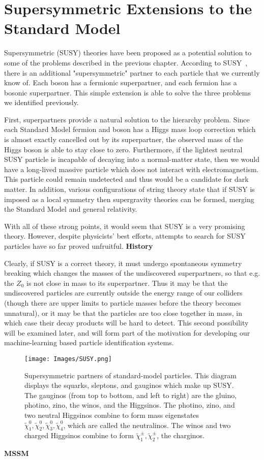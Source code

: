 \chapter{Supersymmetric Extensions to the Standard Model}

Supersymmetric (SUSY) theories have been proposed as a potential solution to some of the problems described in the previous chapter. According to SUSY~\cite{SUSY_primer}, there is an additional "supersymmetric" partner to each particle that we currently know of. Each boson has a fermionic superpartner, and each fermion has a bosonic superpartner. This simple extension is able to solve the three problems we identified previously.

First, superpartners provide a natural solution to the hierarchy problem. Since each Standard Model fermion and boson has a Higgs mass loop correction which is almost exactly cancelled out by its superpartner, the observed mass of the Higgs boson is able to stay close to zero. Furthermore, if the lightest neutral SUSY particle is incapable of decaying into a normal-matter state, then we would have a long-lived massive particle which does not interact with electromagnetism. This particle could remain undetected and thus would be a candidate for dark matter. In addition, various configurations of string theory state that if SUSY is imposed as a local symmetry then supergravity theories can be formed, merging the Standard Model and general relativity.

With all of these strong points, it would seem that SUSY is a very promising theory. However, despite physicists' best efforts, attempts to search for SUSY particles have so far proved unfruitful. \textbf{History}

Clearly, if SUSY is a correct theory, it must undergo spontaneous symmetry breaking which changes the masses of the undiscovered superpartners, so that e.g. the \textbf{$Z_0$} is not close in mass to its superpartner. Thus it may be that the undiscovered particles are currently outside the energy range of our colliders (though there are upper limits to particle masses before the theory becomes unnatural), or it may be that the particles are too close together in mass, in which case their decay products will be hard to detect. This second possibility will be examined later, and will form part of the motivation for developing our machine-learning based particle identification systems.

\begin{figure}[htbp]
    \centering
    \texttt{[image: Images/SUSY.png]}
    \caption{Supersymmetric partners of standard-model particles. This diagram displays the squarks, sleptons, and gauginos which make up SUSY. The gauginos (from top to bottom, and left to right) are the gluino, photino, zino, the winos, and the Higgsinos. The photino, zino, and two neutral Higgsinos combine to form mass eigenstates $\tilde{\chi}^0_1, \tilde{\chi}^0_2, \tilde{\chi}^0_3, \tilde{\chi}^0_4$, which are called the neutralinos. The winos and two charged Higgsinos combine to form $\tilde{\chi}^\pm_1, \tilde{\chi}^\pm_2$, the charginos.}
    \label{fig:my_label}
\end{figure}

\textbf{MSSM}